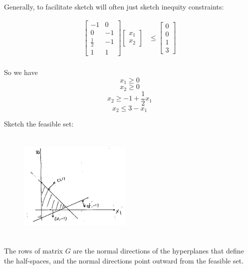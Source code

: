 \begin{example}
	Generally, to facilitate sketch will often just sketch inequity constraints:
	
	\begin{align*}
		\begin{bmatrix}
			-1 & 0\\
			0 & -1\\
			\frac{1}{2} & -1\\
			1 & 1
		\end{bmatrix}
		\begin{bmatrix}
			x_1\\
			x_2
		\end{bmatrix}
		&\leq 
		\begin{bmatrix}
			0\\
			0\\
			1\\
			3
		\end{bmatrix}\\
	\end{align*}
	
	So we have
	$$x_1 \geq 0$$
	$$x_2 \geq 0$$
	$$x_2 \geq -1 + \frac{1}{2}x_1$$
	$$x_2 \leq 3 - x_1$$
	
	Sketch the feasible set:
	
	\begin{figure}
		\centering
		\includegraphics[width=2.1in,height=2.1in]{figures/ch07/figure1012_5.png}
	\end{figure}
\end{example}

The rows of matrix $G$ are the normal directions of the hyperplanes that define the half-spaces, and the normal directions point outward from the feasible set.


